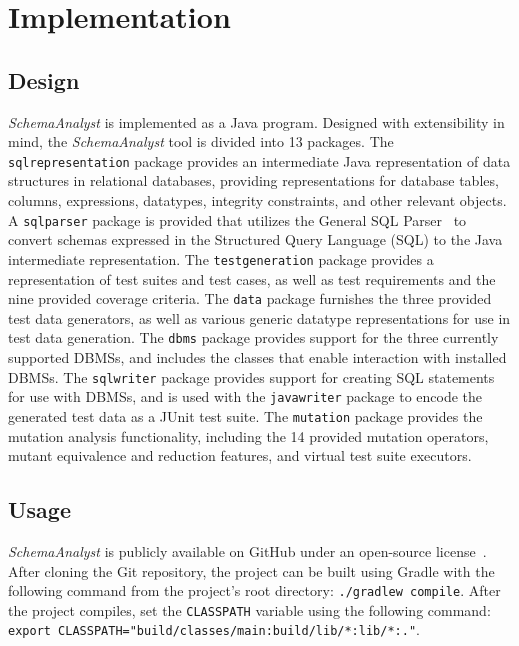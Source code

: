 \section{Implementation}
\subsection{Design}
\textit{SchemaAnalyst} is implemented as a Java program.  Designed with extensibility in mind, the
\textit{SchemaAnalyst} tool is divided into 13 packages. The \texttt{sqlrepresentation} package
provides an intermediate Java representation of data structures in relational databases,
providing representations for database tables, columns, expressions, datatypes, integrity
constraints, and other relevant objects. A \texttt{sqlparser} package is provided that utilizes the
General SQL Parser~\cite{} to convert schemas expressed in the Structured Query Language (SQL) to the
Java intermediate representation. The \texttt{testgeneration} package provides a representation of test
suites and test cases, as well as test requirements and the nine provided coverage criteria. The
\texttt{data} package furnishes the three provided test data generators, as well as various generic
datatype representations for use in test data generation. The \texttt{dbms} package provides support
for the three currently supported DBMSs, and includes the classes that enable interaction with
installed DBMSs. The \texttt{sqlwriter} package provides support for creating SQL statements for use
with DBMSs, and is used with the \texttt{javawriter} package to encode the generated test data as a
JUnit test suite. The \texttt{mutation} package provides the mutation analysis functionality, 
including the 14 provided mutation operators, mutant equivalence and reduction features, and virtual
test suite executors.

\subsection{Usage}

\textit{SchemaAnalyst} is publicly available on GitHub under an open-source license~\cite{tool}. After
cloning the Git repository, the project can be built using Gradle with the following command from the
project's root directory: \lstinline{./gradlew compile}. After the project compiles, set the
\lstinline{CLASSPATH} variable using the following command: \lstinline{export CLASSPATH="build/classes/main:build/lib/*:lib/*:."}. 

